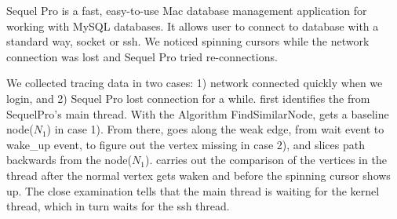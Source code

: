 Sequel Pro is a fast, easy-to-use Mac database management application for
working with MySQL databases. It allows user to connect to database with a
standard way, socket or ssh. We noticed spinning cursors while the network
connection was lost and Sequel Pro tried re-connections.

We collected tracing data in two cases: 1) network connected quickly when we
login, and 2) Sequel Pro lost connection for a while. \xxx first identifies the
\spinningnode from SequelPro's main thread. With the Algorithm FindSimilarNode,
\xxx gets a baseline node($N_1$) in case 1). From there, \xxx goes along the
weak edge, from wait event to wake\_up event, to figure out the vertex missing
in case 2), and slices path backwards from the node($N_1$). \xxx carries out
the comparison of the vertices in the thread after the normal vertex gets waken and
before the spinning cursor shows up. The close examination tells that the
main thread is waiting for the kernel thread, which in turn waits for the ssh
thread.


